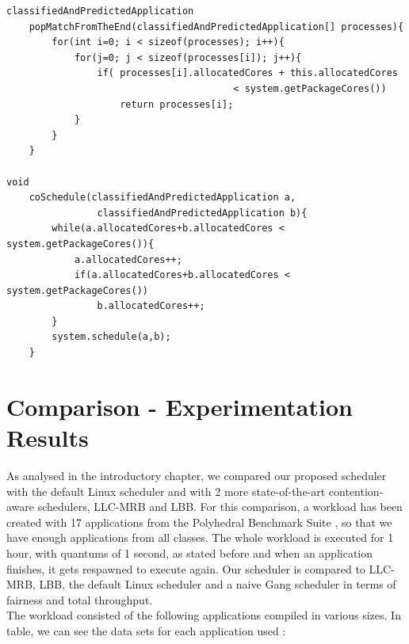 \documentclass[diploma]{Styles/softlab-thesis}
\begin{document}
\small
\begin{Verbatim}[samepage=true, frame=single]
classifiedAndPredictedApplication 
    popMatchFromTheEnd(classifiedAndPredictedApplication[] processes){
        for(int i=0; i < sizeof(processes); i++){
            for(j=0; j < sizeof(processes[i]); j++){
                if( processes[i].allocatedCores + this.allocatedCores 
                                        < system.getPackageCores())
                    return processes[i];
            }
        }
    }

void 
    coSchedule(classifiedAndPredictedApplication a, 
                classifiedAndPredictedApplication b){
        while(a.allocatedCores+b.allocatedCores < system.getPackageCores()){
            a.allocatedCores++;
            if(a.allocatedCores+b.allocatedCores < system.getPackageCores())
                b.allocatedCores++;
        }
        system.schedule(a,b);
    }
\end{Verbatim}
\normalsize

\section{Comparison - Experimentation Results}

As analysed in the introductory chapter, we compared our proposed scheduler with the default Linux scheduler and with 2 more state-of-the-art contention-aware schedulers, LLC-MRB and LBB. For this comparison, a workload has been created with 17 applications from the Polyhedral Benchmark Suite \cite{reference8}, so that we have enough applications from all classes. The whole workload is executed for 1 hour, with quantums of 1 second, as stated before and when an application finishes, it gets respawned to execute again. Our scheduler is compared to LLC-MRB, LBB, the default Linux scheduler and a naive Gang scheduler in terms of fairness and total throughput. \\

The workload consisted of the following applications compiled in various sizes. In table, we can see the data sets for each application used : \\
\end{document}
